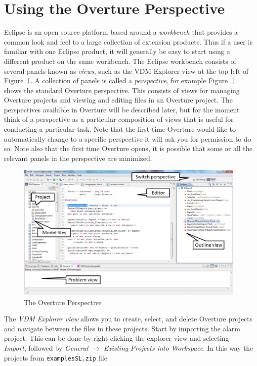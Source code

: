 \section{Using the Overture Perspective}\label{sec:vdmsupport}
Eclipse is an open source platform based around a \emph{workbench} that provides a common look and feel to a large collection of extension products. Thus if a user is familiar with one Eclipse product, it will generally be easy to start using a different product on the same workbench. The Eclipse workbench consists of several panels known as \emph{views}, such as the VDM Explorer view at the top left of Figure~\ref{fig:OverturePerspective}. A collection of panels is called a \emph{perspective}, for example
Figure~\ref{fig:OverturePerspective} shows the standard Overture perspective. This consists of views for managing Overture projects and viewing and editing files in an Overture project. The perspectives
available in Overture will be described later, but for the moment think of a perspective as a particular composition of views that is useful for conducting a particular task. Note that the first time
Overture would like to automatically change to a specific perspective it will ask you for permission to do so.  Note also that the first time Overture opens, it is possible that some or all the relevant panels in the perspective are minimized.
%
\begin{figure}[tbh]
\begin{center}
  \includegraphics[width=5.5in]{figures/OverturePerspective}
  \caption[labelInTOC]{The Overture Perspective}
  \label{fig:OverturePerspective}
\end{center}
\end{figure}
%
The \emph{VDM Explorer view} allows you to create, select, and delete Overture projects and navigate between the files in these projects. Start by importing the alarm project. This can be done by right-clicking the explorer view and selecting \emph{Import}, followed by \emph{General} $\rightarrow$ \emph{Existing Projects into Workspace}.  In this way the projects from \texttt{examplesSL.zip} file

